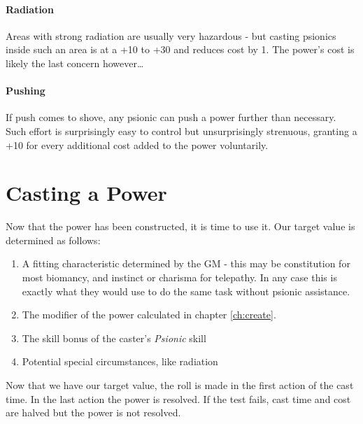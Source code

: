 \documentclass[12pt,a4paper,openany,usenames,dvipsnames]{book}
\begin{document}
	\subsubsection{Radiation}
	Areas with strong radiation are usually very hazardous - but casting psionics inside such an area is at a +10 to +30 and reduces cost by 1. The power’s cost is likely the last concern however…
	\subsubsection{Pushing}
	If push comes to shove, any psionic can push a power further than necessary. Such effort is surprisingly easy to control but unsurprisingly strenuous, granting a +10 for every additional cost added to the power voluntarily.

	\chapter{Casting a Power}
	Now that the power has been constructed, it is time to use it. Our target value is determined as follows:
	\begin{enumerate}
		\item A fitting characteristic determined by the GM - this may be constitution for most biomancy, and instinct or charisma for telepathy. In any case this is exactly what they would use to do the same task without psionic assistance.
		\item The modifier of the power calculated in chapter \ref{ch:create}.
		\item The skill bonus of the caster's \emph{Psionic} skill
		\item Potential special circumstances, like radiation
	\end{enumerate}
	Now that we have our target value, the roll is made in the first action of the cast time. In the last action the power is resolved. If the test fails, cast time and cost are halved but the power is not resolved.
\end{document}
